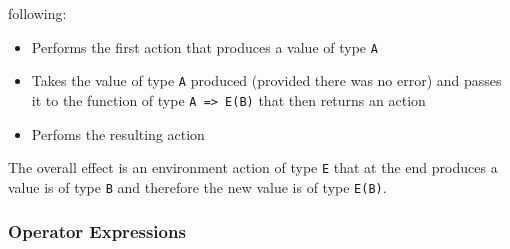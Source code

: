 \documentclass{article}
\begin{document}
following: 
\begin{itemize}
\item
Performs the first action that produces a value of type \texttt{A}

\item
Takes the value of type \texttt{A} produced (provided there was no error) and
passes it to the function of type \texttt{A => E(B)} that then returns an
action

\item
Perfoms the resulting action 
\end{itemize}
The overall effect is an environment action  of type \texttt{E} that at the end
produces a value is of type \texttt{B} and therefore the new value is of type
\texttt{E(B)}.

\subsubsection{Operator Expressions}
\end{document}

